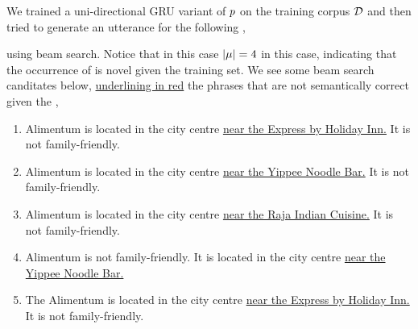 We trained a uni-directional GRU variant of $p$ on the training corpus
$\mathcal{D}$ and then tried to generate an utterance for the following \meaningrepresentation,
\begin{center}
        {}  
        {}
        {}
        {}\end{center}
using beam search. Notice that in this case ${\left\vert \mu \right\vert}=4$ in this case,
indicating that the occurrence of  is novel given
 the training set.
We see some beam search canditates below, {\color{red}\uline{underlining in red}} the phrases that
are not semantically correct given the \meaningrepresentation,

\begin{enumerate}
\item Alimentum is located in the city centre {\color{red}\uline{near the Express by Holiday Inn.}} It is not family-friendly.     
\item Alimentum is located in the city centre {\color{red}\uline{near the Yippee Noodle Bar.}} It is not family-friendly.
\item Alimentum is located in the city centre {\color{red}\uline{near the Raja Indian Cuisine.}} It is not family-friendly.
\item Alimentum is not family-friendly. It is located in the city centre {\color{red}\uline{near the Yippee Noodle Bar.}}
\item The Alimentum is located in the city centre {\color{red}\uline{near the Express by Holiday Inn.}} It is not family-friendly.

\end{enumerate}
